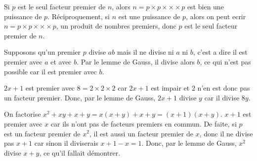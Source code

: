 \sol

Si \(p\) est le seul facteur premier de \(n\), alors \(n = p \times p \times \times \times p\) est bien une puissance de \(p\). Réciproquement, si \(n\) est une puissance de \(p\), alors on peut ecrir \(n = p \times p \times \times \times p\), un produit de nombres premiers, donc \(p\) est le seul facteur premier de \(n\).

\sol

Supposons qu'un premier \(p\) divise \(ab\) mais il ne divise ni \(a\) ni \(b\), c'est a dire il est premier avec \(a\) et avec \(b\). Par le lemme de Gauss, il divise alors \(b\), ce qui n'est pas possible car il est premier avec \(b\).

\sol

\(2x+1\) est premier avec \(8 = 2 \times 2 \times 2\) car \(2x+1\) est impair et \(2\) n'en est donc pas un facteur premier. Donc, par le lemme de Gauss, \(2x+1\) divise \(y\) car il divise \(8y\).

\sol

On factorise \(x^2 + xy + x + y = x\left(x+y\right) + x+y = \left(x+1\right)\left(x+y\right)\). \(x+1\) est premier avec \(x\) car ils n'ont pas de facteurs premiers en commun. De faite, si \(p\) est un facteur premier de \(x^2\), il est aussi un facteur premier de \(x\), donc il ne divise pas \(x+1\) car sinon il diviserais \(x+1-x=1\). Donc, par le lemme de Gauss, \(x^2\) divise \(x+y\), ce qu'il fallait démontrer.
